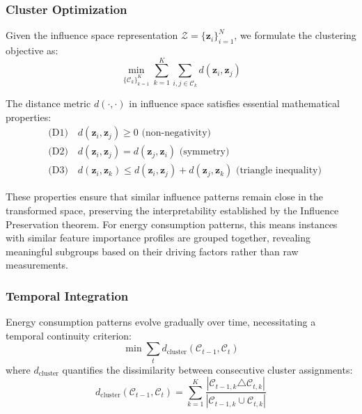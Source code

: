 \documentclass[final,5p,times,twocolumn,numbers]{elsarticle}
\begin{document}
\subsubsection{Cluster Optimization}
Given the influence space representation $\mathcal{Z} = \{\mathbf{z}_i\}_{i=1}^N$, we formulate the clustering objective as:
\begin{equation}
    \min_{\{\mathcal{C}_k\}_{k=1}^K} \sum_{k=1}^K \sum_{i,j \in \mathcal{C}_k} d(\mathbf{z}_i, \mathbf{z}_j)
\end{equation}

The distance metric $d(\cdot,\cdot)$ in influence space satisfies essential mathematical properties:
\begin{equation}
    \begin{aligned}
    & \text{(D1)} \quad d(\mathbf{z}_i, \mathbf{z}_j) \geq 0 \text{ (non-negativity)} \\
    & \text{(D2)} \quad d(\mathbf{z}_i, \mathbf{z}_j) = d(\mathbf{z}_j, \mathbf{z}_i) \text{ (symmetry)} \\
    & \text{(D3)} \quad d(\mathbf{z}_i, \mathbf{z}_k) \leq d(\mathbf{z}_i, \mathbf{z}_j) + d(\mathbf{z}_j, \mathbf{z}_k) \text{ (triangle inequality)}
    \end{aligned}
\end{equation}

These properties ensure that similar influence patterns remain close in the transformed space, preserving the interpretability established by the Influence Preservation theorem. For energy consumption patterns, this means instances with similar feature importance profiles are grouped together, revealing meaningful subgroups based on their driving factors rather than raw measurements.

\subsubsection{Temporal Integration}
Energy consumption patterns evolve gradually over time, necessitating a temporal continuity criterion:
\begin{equation}
    \min \sum_{t} d_{\text{cluster}}(\mathcal{C}_{t-1}, \mathcal{C}_t)
\end{equation}
where $d_{\text{cluster}}$ quantifies the dissimilarity between consecutive cluster assignments:
\begin{equation}
    d_{\text{cluster}}(\mathcal{C}_{t-1}, \mathcal{C}_t) = \sum_{k=1}^K \frac{|\mathcal{C}_{t-1,k} \triangle \mathcal{C}_{t,k}|}{|\mathcal{C}_{t-1,k} \cup \mathcal{C}_{t,k}|}
\end{equation}
\end{document}
